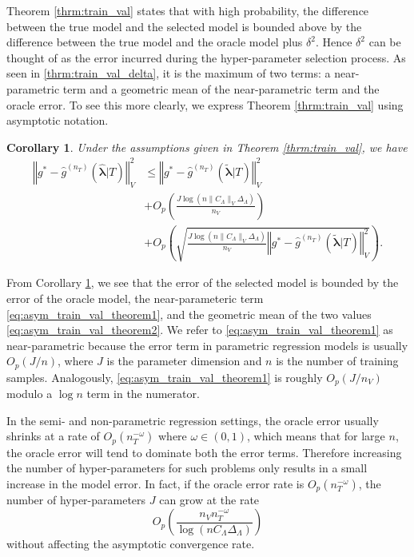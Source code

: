 \documentclass[12pt]{article} %
\newtheorem{corollary}{Corollary}
\theoremstyle{definition}
\begin{document}
Theorem \ref{thrm:train_val} states that with high probability, the difference between the true model and the selected model is bounded above by the difference between the true model and the oracle model plus $\delta^2$. Hence $\delta^2$ can be thought of as the error incurred during the hyper-parameter selection process. As seen in \eqref{thrm:train_val_delta}, it is the maximum of two terms: a near-parametric term and a geometric mean of the near-parametric term and the oracle error. To see this more clearly, we express Theorem \ref{thrm:train_val} using asymptotic notation.
\begin{corollary}
	\label{corr:train_val}
	Under the assumptions given in Theorem \ref{thrm:train_val}, we have
	\begin{align}
	\left\Vert g^* - \hat{g}^{(n_T)}( \hat{\boldsymbol{\lambda}} | T) \right\Vert _{V}^2 &\le \left\Vert g^* - \hat{g}^{(n_T)}( \tilde{\boldsymbol{\lambda}} | T) \right \Vert^2_{V}\\
	& + O_p \left(\frac{J\log (n \|C_\Lambda\|_V \Delta_{\Lambda} )}{n_{V}} \right) 
	\label{eq:asym_train_val_theorem1} \\
	& + O_p \left(
	\sqrt{
		\frac{J \log (n \|C_\Lambda\|_V \Delta_{\Lambda} )}{n_{V}}
		\left\Vert g^* - \hat{g}^{(n_T)}( \tilde{\boldsymbol{\lambda}}| T) \right \Vert^2_{V}
	}
	\right ).
	\label{eq:asym_train_val_theorem2}
	\end{align}
\end{corollary}
From Corollary \ref{corr:train_val}, we see that the error of the selected model is bounded by the error of the oracle model, the near-parameteric term \eqref{eq:asym_train_val_theorem1}, and the geometric mean of the two values \eqref{eq:asym_train_val_theorem2}. We refer to \eqref{eq:asym_train_val_theorem1} as near-parametric because the error term in parametric regression models is usually $O_p(J/n)$, where $J$ is the parameter dimension and $n$ is the number of training samples. Analogously, \eqref{eq:asym_train_val_theorem1} is roughly $O_p(J/n_V)$ modulo a $\log n$ term in the numerator.

In the semi- and non-parametric regression settings, the oracle error usually shrinks at a rate of $O_p(n_T^{-\omega})$ where $\omega \in (0, 1)$, which means that for large $n$, the oracle error will tend to dominate both the error terms. Therefore increasing the number of hyper-parameters for such problems only results in a small increase in the model error. In fact, if the oracle error rate is $O_p(n_T^{-\omega})$, the number of hyper-parameters $J$ can grow at the rate
\begin{equation}
O_p\left (
\frac{n_{V} n_T^{-\omega}}{\log (n C_\Lambda\Delta_{\Lambda})}
\right )
\end{equation}
without affecting the asymptotic convergence rate.
\end{document}
